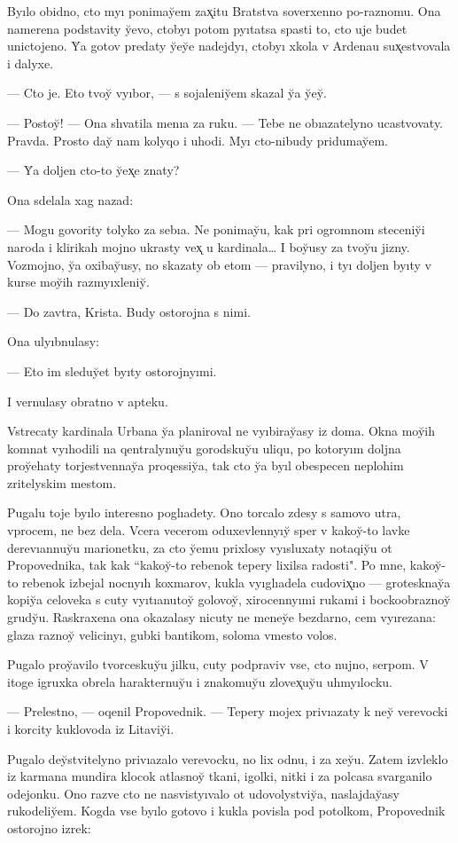 \documentclass[10pt]{book}
\begin{document}
Byılo obidno, cto myı ponimay̆em zax̨itu Bratstva soverxenno po-raznomu. Ona namerena podstavity y̆evo, ctobyı potom pyıtatsa spasti to, cto uje budet unictojeno. Y̆a gotov predaty y̆ey̆e nadejdyı, ctobyı xkola v Ardenau sux̨estvovala i dalyxe.

— Cto je. Eto tvoy̆ vyıbor, — s sojaleniy̆em skazal y̆a y̆ey̆.

— Postoy̆! — Ona shvatila menıa za ruku. — Tebe ne obıazatelyno ucastvovaty. Pravda. Prosto day̆ nam kolyqo i uhodi. Myı cto-nibudy pridumay̆em.

— Y̆a doljen cto-to y̆ex̨e znaty?

Ona sdelala xag nazad:

— Mogu govority tolyko za sebıa. Ne ponimay̆u, kak pri ogromnom steceniy̆i naroda i klirikah mojno ukrasty vex̨ u kardinala… I boy̆usy za tvoy̆u jizny. Vozmojno, y̆a oxibay̆usy, no skazaty ob etom — pravilyno, i tyı doljen byıty v kurse moy̆ih razmyıxleniy̆.

— Do zavtra, Krista. Budy ostorojna s nimi.

Ona ulyıbnulasy:

— Eto im sleduy̆et byıty ostorojnyımi.

I vernulasy obratno v apteku.

Vstrecaty kardinala Urbana y̆a planiroval ne vyıbiray̆asy iz doma. Okna moy̆ih komnat vyıhodili na qentralynuy̆u gorodskuy̆u uliqu, po kotoryım doljna proy̆ehaty torjestvennay̆a proqessiy̆a, tak cto y̆a byıl obespecen neplohim zritelyskim mestom.

Pugalu toje byılo interesno poglıadety. Ono torcalo zdesy s samovo utra, vprocem, ne bez dela. Vcera vecerom oduxevlennyıy̆ sper v kakoy̆-to lavke derevıannuy̆u marionetku, za cto y̆emu prixlosy vyısluxaty notaqiy̆u ot Propovednika, tak kak ``kakoy̆-to rebenok tepery lixilsa radosti". Po mne, kakoy̆-to rebenok izbejal nocnyıh koxmarov, kukla vyıglıadela cudovix̨no — grotesknay̆a kopiy̆a celoveka s cuty vyıtıanutoy̆ golovoy̆, xirocennyımi rukami i bockoobraznoy̆ grudy̆u. Raskraxena ona okazalasy nicuty ne meney̆e bezdarno, cem vyırezana: glaza raznoy̆ velicinyı, gubki bantikom, soloma vmesto volos.

Pugalo proy̆avilo tvorceskuy̆u jilku, cuty podpraviv vse, cto nujno, serpom. V itoge igruxka obrela harakternuy̆u i znakomuy̆u zlovex̨uy̆u uhmyılocku.

— Prelestno, — oqenil Propovednik. — Tepery mojex privıazaty k ney̆ verevocki i korcity kuklovoda iz Litaviy̆i.

Pugalo dey̆stvitelyno privıazalo verevocku, no lix odnu, i za xey̆u. Zatem izvleklo iz karmana mundira klocok atlasnoy̆ tkani, igolki, nitki i za polcasa svarganilo odejonku. Ono razve cto ne nasvistyıvalo ot udovolystviy̆a, naslajday̆asy rukodeliy̆em. Kogda vse byılo gotovo i kukla povisla pod potolkom, Propovednik ostorojno izrek:
\end{document}
